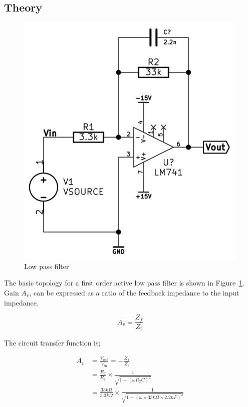\documentclass[11pt,a4paper]{article}
\begin{document}
\subsection{Theory}\label{lpf-theory}
\begin{figure}[htbp]
    \centering
        \includegraphics[scale=0.5]{img/lowpassfilter.png}
    \caption{Low pass filter}
    \label{fig:lpf-schem}
\end{figure}

The basic topology for a first order active low pass filter is shown in
Figure~\ref{fig:lpf-schem}.  Gain $A_v$, can be expressed as a ratio of the
feedback impedance to the input impedance. 

\begin{equation}
    A_v = \frac{Z_f}{Z_i}
\end{equation}

The circuit transfer function is;

\begin{align} 
A_v     &= \frac{V_{out}}{V_{in}} = -\frac{Z_f}{Z_i}\\
        &= \frac{R_2}{R_1} \times \frac{1}{\sqrt{1+\left(\omega R_2 C\right)^2}}\\
        &= \frac{33k\Omega}{3.3k\Omega} \times \frac{1}{\sqrt{1+\left(\omega \times 33k\Omega \times 2.2nF\right)^2}}
\end{align}
\end{document}
